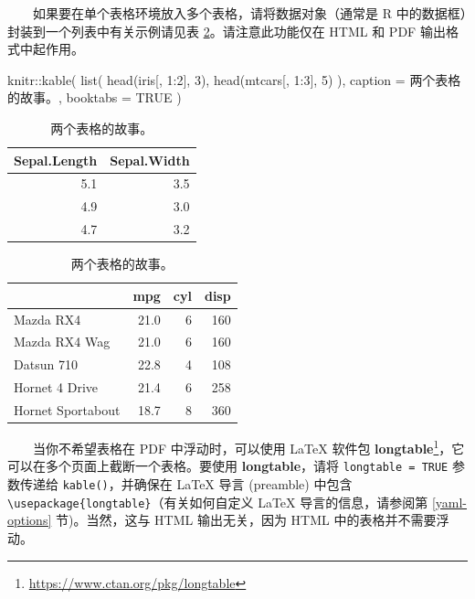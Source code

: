 \documentclass[
  12pt,
]{krantz}
\newenvironment{Shaded}{\begin{snugshade}}{\end{snugshade}}
\newcommand{\AttributeTok}[1]{\textcolor[rgb]{0.77,0.63,0.00}{#1}}
\newcommand{\ConstantTok}[1]{\textcolor[rgb]{0.00,0.00,0.00}{#1}}
\newcommand{\DecValTok}[1]{\textcolor[rgb]{0.00,0.00,0.81}{#1}}
\newcommand{\FunctionTok}[1]{\textcolor[rgb]{0.00,0.00,0.00}{#1}}
\newcommand{\NormalTok}[1]{#1}
\newcommand{\SpecialCharTok}[1]{\textcolor[rgb]{0.00,0.00,0.00}{#1}}
\newcommand{\StringTok}[1]{\textcolor[rgb]{0.31,0.60,0.02}{#1}}
\renewcommand{\href}[2]{#2\footnote{\url{#1}}}
\theoremstyle{definition}
\theoremstyle{definition}
\theoremstyle{definition}
\theoremstyle{definition}
\theoremstyle{remark}
\begin{document}
  如果要在单个表格环境放入多个表格，请将数据对象（通常是 R 中的数据框）封装到一个列表中有关示例请见表 \ref{tab:table-multi}。请注意此功能仅在 HTML 和 PDF 输出格式中起作用。

\begin{Shaded}
\begin{Highlighting}[]
\NormalTok{knitr}\SpecialCharTok{::}\FunctionTok{kable}\NormalTok{(}
  \FunctionTok{list}\NormalTok{(}
    \FunctionTok{head}\NormalTok{(iris[, }\DecValTok{1}\SpecialCharTok{:}\DecValTok{2}\NormalTok{], }\DecValTok{3}\NormalTok{),}
    \FunctionTok{head}\NormalTok{(mtcars[, }\DecValTok{1}\SpecialCharTok{:}\DecValTok{3}\NormalTok{], }\DecValTok{5}\NormalTok{)}
\NormalTok{  ),}
  \AttributeTok{caption =} \StringTok{\textquotesingle{}两个表格的故事。\textquotesingle{}}\NormalTok{, }\AttributeTok{booktabs =} \ConstantTok{TRUE}
\NormalTok{)}
\end{Highlighting}
\end{Shaded}

\begin{table}
\caption{\label{tab:table-multi}两个表格的故事。}

\centering
\begin{tabular}[t]{rr}
\toprule
Sepal.Length & Sepal.Width\\
\midrule
5.1 & 3.5\\
4.9 & 3.0\\
4.7 & 3.2\\
\bottomrule
\end{tabular}
\centering
\begin{tabular}[t]{lrrr}
\toprule
  & mpg & cyl & disp\\
\midrule
Mazda RX4 & 21.0 & 6 & 160\\
Mazda RX4 Wag & 21.0 & 6 & 160\\
Datsun 710 & 22.8 & 4 & 108\\
Hornet 4 Drive & 21.4 & 6 & 258\\
Hornet Sportabout & 18.7 & 8 & 360\\
\bottomrule
\end{tabular}
\end{table}

  当你不希望表格在 PDF 中浮动时，可以使用 LaTeX 软件包 \href{https://www.ctan.org/pkg/longtable}{\textbf{longtable}}，它可以在多个页面上截断一个表格。要使用 \textbf{longtable}，请将 \texttt{longtable\ =\ TRUE} 参数传递给 \texttt{kable()}，并确保在 LaTeX 导言 (preamble) 中包含 \texttt{\textbackslash{}usepackage\{longtable\}}（有关如何自定义 LaTeX 导言的信息，请参阅第 \ref{yaml-options} 节)。当然，这与 HTML 输出无关，因为 HTML 中的表格并不需要浮动。
\end{document}
